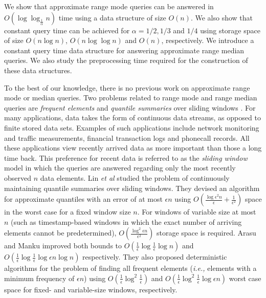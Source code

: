 \documentclass{llncs}
\begin{document}
We show that approximate range mode queries can be answered in
\linebreak[4]$O(\log\log_{\frac{1}{\alpha}} n)$ time using a data 
structure of size $O(n)$. We also show that constant query 
time can be achieved for
$\alpha = 1/2, 1/3$ and $1/4$ using storage space of size $O(n\log n)$,
$O(n\log \log n)$ and $O(n)$, respectively. We introduce a constant 
query time data structure for answering approximate range median
queries. We also study the preprocessing time required for
the construction of these data structures.


To the best of our knowledge, there is no previous work
on approximate range mode or median queries. Two problems related 
to range mode and range median queries are {\it frequent elements}
and {\it quantile summaries} over sliding windows \cite{am04,llxy04}. 
For many applications, data takes the form of continuous 
data streams, as opposed to finite stored data sets.
Examples of such applications include
network monitoring and traffic measurements, financial transaction 
logs and phonecall records. All these applications view recently arrived 
data as more important than those a long time back. This preference 
for recent data is referred to as the {\it sliding window} 
model \cite{dgim02} in which the queries are answered regarding only 
the most recently observed $n$ data elements. Lin {\it et al}
\cite{llxy04} studied the problem of continuously maintaining 
quantile summaries over sliding windows. They devised an algorithm 
for approximate quantiles with an error of at most $\epsilon n$ using 
$O(\frac{\log \epsilon^2 n}{\epsilon} + \frac{1}{\epsilon^2})$ 
space in the worst case for a fixed window size $n$. For 
 windows of variable size at most $n$ (such as timestamp-based 
windows in which the exact number of arriving elements 
cannot be predetermined), $O(\frac{\log^2 \epsilon n}{\epsilon^2})$ 
storage space is required.
Arasu and Manku \cite{am04} improved both bounds to 
$O(\frac{1}{\epsilon}\log \frac{1}{\epsilon}\log n)$ and
$O(\frac{1}{\epsilon}\log \frac{1}{\epsilon} \log \epsilon n\log n)$
respectively. They also proposed deterministic 
algorithms for the problem of finding all
frequent elements ({\it i.e.,} elements with a minimum 
frequency of $\epsilon n$) using $O(\frac{1}{\epsilon} 
\log^2 \frac{1}{\epsilon})$
and $O(\frac{1}{\epsilon}\log^2 \frac{1}{\epsilon} \log \epsilon n)$
worst case space for fixed- and variable-size windows, respectively.  



 
\end{document}
